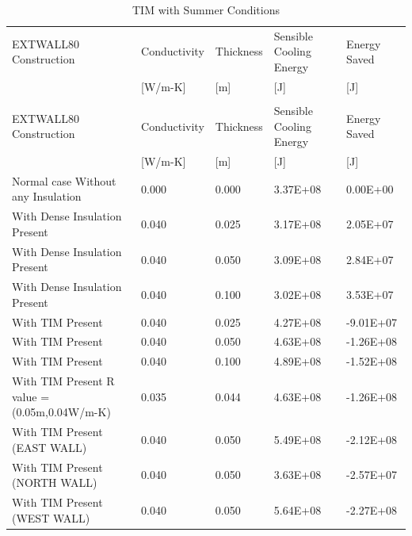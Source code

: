 {\scriptsize
\begin{longtable}[c]{p{2.5in}p{0.75in}p{0.75in}p{0.75in}p{0.75in}}
\caption{TIM with Summer Conditions \label{table:tim-with-summer-conditions-000}} \tabularnewline
\toprule 
EXTWALL80 Construction & Conductivity & Thickness & Sensible Cooling Energy & Energy Saved \tabularnewline
~ & [W/m-K] & [m] & [J] & [J] \tabularnewline
\midrule
\endfirsthead

\caption[]{TIM with Summer Conditions} \tabularnewline
\toprule
EXTWALL80 Construction & Conductivity & Thickness & Sensible Cooling Energy & Energy Saved \tabularnewline
~ & [W/m-K] & [m] & [J] & [J] \tabularnewline
\midrule
\endhead

Normal case Without any Insulation & 0.000 & 0.000 & 3.37E+08 & 0.00E+00 \tabularnewline
With Dense Insulation Present & 0.040 & 0.025 & 3.17E+08 & 2.05E+07 \tabularnewline
With Dense Insulation Present & 0.040 & 0.050 & 3.09E+08 & 2.84E+07 \tabularnewline
With Dense Insulation Present & 0.040 & 0.100 & 3.02E+08 & 3.53E+07 \tabularnewline
With TIM Present & 0.040 & 0.025 & 4.27E+08 & -9.01E+07 \tabularnewline
With TIM Present & 0.040 & 0.050 & 4.63E+08 & -1.26E+08 \tabularnewline
With TIM Present & 0.040 & 0.100 & 4.89E+08 & -1.52E+08 \tabularnewline
With TIM Present R value = (0.05m,0.04W/m-K) & 0.035 & 0.044 & 4.63E+08 & -1.26E+08 \tabularnewline
With TIM Present (EAST WALL) & 0.040 & 0.050 & 5.49E+08 & -2.12E+08 \tabularnewline
With TIM Present (NORTH WALL) & 0.040 & 0.050 & 3.63E+08 & -2.57E+07 \tabularnewline
With TIM Present (WEST WALL) & 0.040 & 0.050 & 5.64E+08 & -2.27E+08 \tabularnewline
\bottomrule
\end{longtable}}

